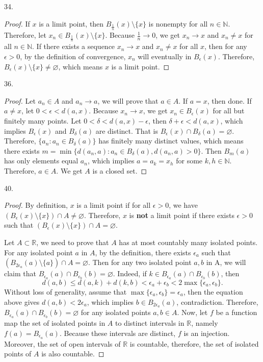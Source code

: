 \documentclass[12pt, a4paper]{article}
\theoremstyle{plain}
\newcommand{\N}{\mathbb{N}}
\newcommand{\R}{\mathbb{R}}
\begin{document}
34.
\begin{proof}
If $x$ is a limit point, then $B_\frac{1}{n}(x)\setminus\{x\}$ is nonempty for all $n\in\N$. Therefore, let $x_n\in B_\frac{1}{n}(x)\setminus\{x\}$. Because $\frac{1}{n}\rightarrow 0$, we get $x_n\rightarrow x$ and $x_n\neq x$ for all $n\in\N$. If there exists a sequence $x_n\rightarrow x$ and $x_n\neq x$ for all $x$, then for any $\epsilon>0$, by the definition of convergence, $x_n$ will eventually in $B_\epsilon(x)$. Therefore, $B_\epsilon(x)\setminus\{x\}\neq \varnothing$, which means $x$ is a limit point.
\end{proof}

36.
\begin{proof}
Let $a_n\in A$ and $a_n\rightarrow a$, we will prove that $a\in A$. If $a=x$, then done. If $a\neq x$, let $0<\epsilon <d(a,x)$. Because $x_n\rightarrow x$, we get $x_n\in B_\epsilon(x)$ for all but finitely many points. Let $0<\delta<d(a,x)-\epsilon$, then $\delta +\epsilon<d(a,x)$, which implies $B_\epsilon(x)$ and $B_\delta(a)$ are distinct. That is $B_\epsilon(x)\cap B_\delta(a)=\varnothing$. Therefore, $\{a_n:a_n\in B_\delta(a)\}$ has finitely many distinct values, which means there exists $m=\min\{d(a_n,a):a_n\in B_\delta(a), d(a_n,a)>0\}$. Then $B_m(a)$ has only elements equal $a_n$, which implies $a=a_k=x_h$ for some $k,h\in\N$. Therefore, $a\in A$. We get $A$ is a closed set.
\end{proof}

\pagebreak

40.
\begin{proof}
By definition, $x$ is a limit point if for all $\epsilon >0$, we have $(B_\epsilon(x)\setminus \{x\})\cap A\neq\varnothing$.  Therefore, $x$ is \textbf{not} a limit point if there exists $\epsilon>0$ such that $(B_\epsilon(x)\setminus \{x\})\cap A=\varnothing$.    

Let $A\subset \R$, we need to prove that $A$ has at most countably many isolated points. For any isolated point $a$ in $A$, by the definition, there exists $\epsilon_a$ such that $(B_{2\epsilon_a}(a)\setminus\{a\})\cap A=\varnothing$. Then for any  two isolated point $a,b$ in A, we will claim that $B_{\epsilon_a}(a)\cap B_{\epsilon_b}(b)=\varnothing$. Indeed, if $k\in B_{\epsilon_a}(a)\cap B_{\epsilon_b}(b)$, then 
\[
d(a,b)\leq d(a,k)+d(k,b)<\epsilon_a +\epsilon_b <2\max\{\epsilon_a,\epsilon_b\}.
\]
Without loss of generality, assume that $\max\{\epsilon_a,\epsilon_b\}=\epsilon_a$, then the equation above gives $d(a,b)<2\epsilon_a$, which implies $b\in B_{2\epsilon_a}(a)$, contradiction. Therefore, $B_{\epsilon_a}(a)\cap B_{\epsilon_b}(b)=\varnothing$ for any isolated points $a,b\in A$. Now, let $f$ be a function map the set of isolated points in $A$ to distinct intervals in $\R$, namely $f(a)=B_{\epsilon_a}(a)$. Because these intervals are distinct, $f$ is an injection. Moreover, the set of open intervals of $\R$ is countable, therefore, the set of isolated points of $A$ is also countable.
\end{proof}
\end{document}
